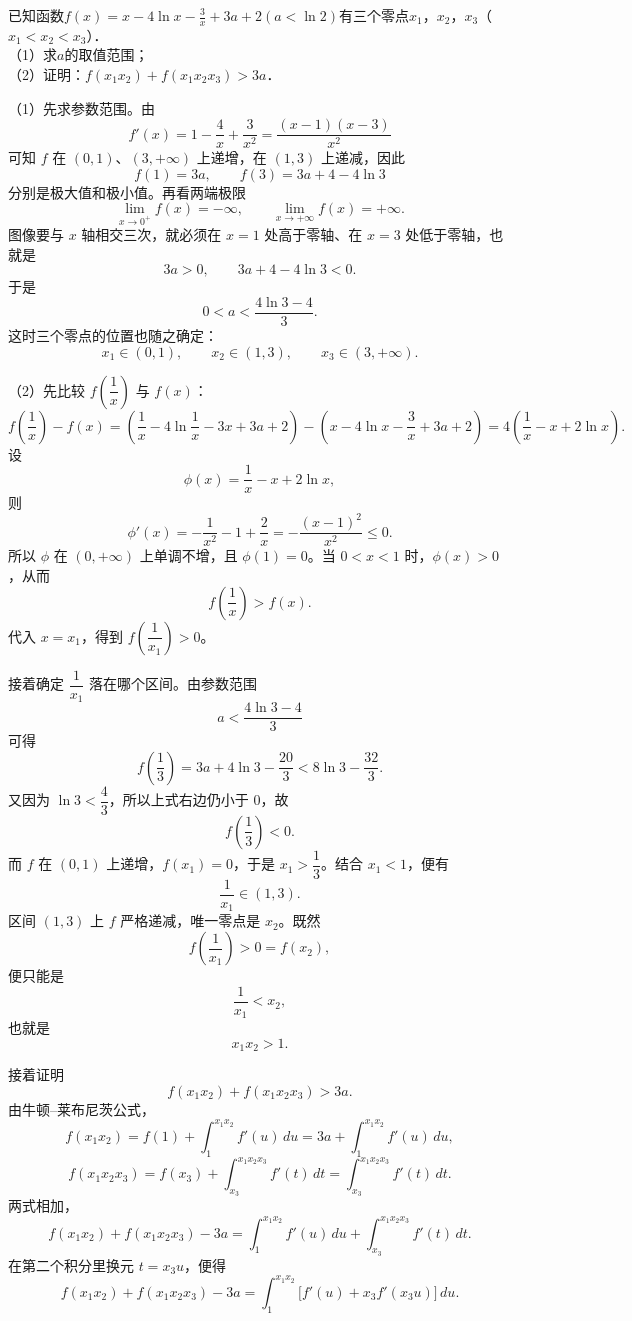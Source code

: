 \begin{example}[零点与极值题]
    已知函数$f(x)=x-4\ln x-\frac{3}{x}+3a+2(a<\ln 2)$有三个零点$x_{1}$，$x_{2}$，$x_{3}$（$x_{1}<x_{2}<x_{3}$）． \\ 
（1）求$a$的取值范围；  \\
（2）证明：$f(x_{1}x_{2})+f(x_{1}x_{2}x_{3})>3a$．
\end{example}
\begin{solution}
（1）先求参数范围。由
\[
f'(x)=1-\frac4x+\frac3{x^2}=\frac{(x-1)(x-3)}{x^2}
\]
可知 $f$ 在 $(0,1)$、$(3,+\infty)$ 上递增，在 $(1,3)$ 上递减，因此
\[
f(1)=3a,\qquad f(3)=3a+4-4\ln3
\]
分别是极大值和极小值。再看两端极限
\[
\lim_{x\to0^+}f(x)=-\infty,\qquad \lim_{x\to+\infty}f(x)=+\infty.
\]
图像要与 $x$ 轴相交三次，就必须在 $x=1$ 处高于零轴、在 $x=3$ 处低于零轴，也就是
\[
3a>0,\qquad 3a+4-4\ln3<0.
\]
于是
\[
0<a<\frac{4\ln3-4}{3}.
\]
这时三个零点的位置也随之确定：
\[
x_1\in(0,1),\qquad x_2\in(1,3),\qquad x_3\in(3,+\infty).
\]

（2）先比较 $f\!\left(\dfrac1x\right)$ 与 $f(x)$：
\[
f\!\left(\frac1x\right)-f(x)
=\left(\frac1x-4\ln\frac1x-3x+3a+2\right)-\left(x-4\ln x-\frac3x+3a+2\right)
=4\left(\frac1x-x+2\ln x\right).
\]
设
\[
\phi(x)=\frac1x-x+2\ln x,
\]
则
\[
\phi'(x)=-\frac1{x^2}-1+\frac2x=-\frac{(x-1)^2}{x^2}\le0.
\]
所以 $\phi$ 在 $(0,+\infty)$ 上单调不增，且 $\phi(1)=0$。当 $0<x<1$ 时，$\phi(x)>0$，从而
\[
f\!\left(\frac1x\right)>f(x).
\]
代入 $x=x_1$，得到 $f\!\left(\dfrac1{x_1}\right)>0$。

接着确定 $\dfrac1{x_1}$ 落在哪个区间。由参数范围
\[
a<\frac{4\ln3-4}{3}
\]
可得
\[
f\!\left(\frac13\right)=3a+4\ln3-\frac{20}{3}<8\ln3-\frac{32}{3}.
\]
又因为 $\ln3<\dfrac43$，所以上式右边仍小于 $0$，故
\[
f\!\left(\frac13\right)<0.
\]
而 $f$ 在 $(0,1)$ 上递增，$f(x_1)=0$，于是 $x_1>\dfrac13$。结合 $x_1<1$，便有
\[
\frac1{x_1}\in(1,3).
\]
区间 $(1,3)$ 上 $f$ 严格递减，唯一零点是 $x_2$。既然
\[
f\!\left(\frac1{x_1}\right)>0=f(x_2),
\]
便只能是
\[
\frac1{x_1}<x_2,
\]
也就是
\[
x_1x_2>1.
\]

接着证明
\[
f(x_1x_2)+f(x_1x_2x_3)>3a.
\]
由牛顿--莱布尼茨公式，
\[
f(x_1x_2)=f(1)+\int_1^{x_1x_2}f'(u)\,du
=3a+\int_1^{x_1x_2}f'(u)\,du,
\]
\[
f(x_1x_2x_3)=f(x_3)+\int_{x_3}^{x_1x_2x_3}f'(t)\,dt
=\int_{x_3}^{x_1x_2x_3}f'(t)\,dt.
\]
两式相加，
\[
f(x_1x_2)+f(x_1x_2x_3)-3a
=\int_1^{x_1x_2}f'(u)\,du+\int_{x_3}^{x_1x_2x_3}f'(t)\,dt.
\]
在第二个积分里换元 $t=x_3u$，便得
\[
f(x_1x_2)+f(x_1x_2x_3)-3a
=\int_1^{x_1x_2}\bigl[f'(u)+x_3f'(x_3u)\bigr]\,du.
\]


\end{solution}
